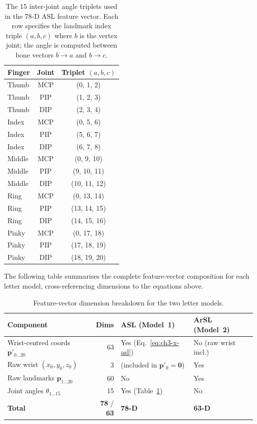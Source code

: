 \begin{table}[H]
\centering
\caption{The 15 inter-joint angle triplets used in the 78-D ASL feature vector. Each row specifies the landmark index triple $(a, b, c)$ where $b$ is the vertex joint; the angle is computed between bone vectors $b{\to}a$ and $b{\to}c$.}
\label{tab:ch3-angle-triplets}
\small
\begin{tabular}{|l|c|c|}
\hline
\textbf{Finger} & \textbf{Joint} & \textbf{Triplet $(a, b, c)$} \\
\hline
Thumb  & MCP & (0, 1, 2) \\
Thumb  & PIP & (1, 2, 3) \\
Thumb  & DIP & (2, 3, 4) \\
Index  & MCP & (0, 5, 6) \\
Index  & PIP & (5, 6, 7) \\
Index  & DIP & (6, 7, 8) \\
Middle & MCP & (0, 9, 10) \\
Middle & PIP & (9, 10, 11) \\
Middle & DIP & (10, 11, 12) \\
Ring   & MCP & (0, 13, 14) \\
Ring   & PIP & (13, 14, 15) \\
Ring   & DIP & (14, 15, 16) \\
Pinky  & MCP & (0, 17, 18) \\
Pinky  & PIP & (17, 18, 19) \\
Pinky  & DIP & (18, 19, 20) \\
\hline
\end{tabular}
\end{table}
\vspace{0.4cm}

\noindent The following table summarises the complete feature-vector composition for each letter model, cross-referencing dimensions to the equations above.

\begin{table}[H]
\centering
\caption{Feature-vector dimension breakdown for the two letter models.}
\label{tab:ch3-feature-dim}
\small
\begin{tabular}{|P{2.4cm}|r|P{3.6cm}|P{3.6cm}|}
\hline
\textbf{Component} & \textbf{Dims} & \textbf{ASL (Model~1)} & \textbf{ArSL (Model~2)} \\
\hline
Wrist-centred coords $\mathbf{p}'_{0\ldots20}$ & 63 & Yes (Eq.~\eqref{eq:ch3-x-asl}) & No (raw wrist incl.) \\
Raw wrist $(x_0,y_0,z_0)$                        &  3 & (included in $\mathbf{p}'_0{=}\mathbf{0}$) & Yes \\
Raw landmarks $\mathbf{p}_{1\ldots20}$           & 60 & No  & Yes \\
Joint angles $\theta_{1\ldots15}$                & 15 & Yes (Table~\ref{tab:ch3-angle-triplets}) & No \\
\hline
\textbf{Total}                                   & \textbf{78} / \textbf{63} & \textbf{78-D} & \textbf{63-D} \\
\hline
\end{tabular}
\end{table}
\vspace{0.4cm}

